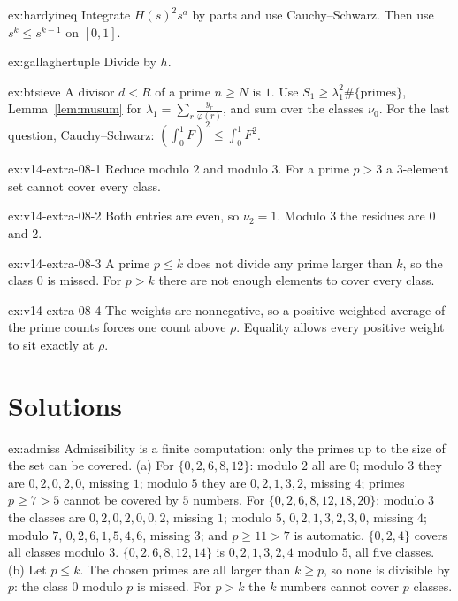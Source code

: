 \begin{hint}{ex:hardyineq}
Integrate $H(s)^2s^a$ by parts and use Cauchy--Schwarz. Then use $s^{k}\le s^{k-1}$ on $[0,1]$.
\end{hint}

\begin{hint}{ex:gallaghertuple}
Divide by $h$.
\end{hint}

\begin{hint}{ex:btsieve}
A divisor $d<R$ of a prime $n\ge N$ is $1$. Use $S_1\ge\lambda_1^2\#\{\text{primes}\}$, Lemma~\ref{lem:musum} for $\lambda_1=\sum_r\frac{y_r}{\varphi(r)}$, and sum over the classes $\nu_0$. For the last question, Cauchy--Schwarz: $(\int_0^1F)^2\le\int_0^1F^2$.
\end{hint}

\begin{hint}{ex:v14-extra-08-1}
Reduce modulo $2$ and modulo $3$. For a prime $p>3$ a $3$-element set cannot cover every class.
\end{hint}

\begin{hint}{ex:v14-extra-08-2}
Both entries are even, so $\nu_2=1$. Modulo $3$ the residues are $0$ and $2$.
\end{hint}

\begin{hint}{ex:v14-extra-08-3}
A prime $p\le k$ does not divide any prime larger than $k$, so the class $0$ is missed. For $p>k$ there are not enough elements to cover every class.
\end{hint}

\begin{hint}{ex:v14-extra-08-4}
The weights are nonnegative, so a positive weighted average of the prime counts forces one count above $\rho$. Equality allows every positive weight to sit exactly at $\rho$.
\end{hint}

\section{Solutions}

\begin{solution}{ex:admiss}
\idea Admissibility is a finite computation: only the primes up to the size of the set can be covered.
\writeup (a) For $\{0,2,6,8,12\}$: modulo $2$ all are $0$; modulo $3$ they are $0,2,0,2,0$, missing $1$; modulo $5$ they are $0,2,1,3,2$, missing $4$; primes $p\ge7>5$ cannot be covered by $5$ numbers. For $\{0,2,6,8,12,18,20\}$: modulo $3$ the classes are $0,2,0,2,0,0,2$, missing $1$; modulo $5$, $0,2,1,3,2,3,0$, missing $4$; modulo $7$, $0,2,6,1,5,4,6$, missing $3$; and $p\ge11>7$ is automatic. $\{0,2,4\}$ covers all classes modulo $3$. $\{0,2,6,8,12,14\}$ is $0,2,1,3,2,4$ modulo $5$, all five classes.
(b) Let $p\le k$. The chosen primes are all larger than $k\ge p$, so none is divisible by $p$: the class $0$ modulo $p$ is missed. For $p>k$ the $k$ numbers cannot cover $p$ classes.
\end{solution}

